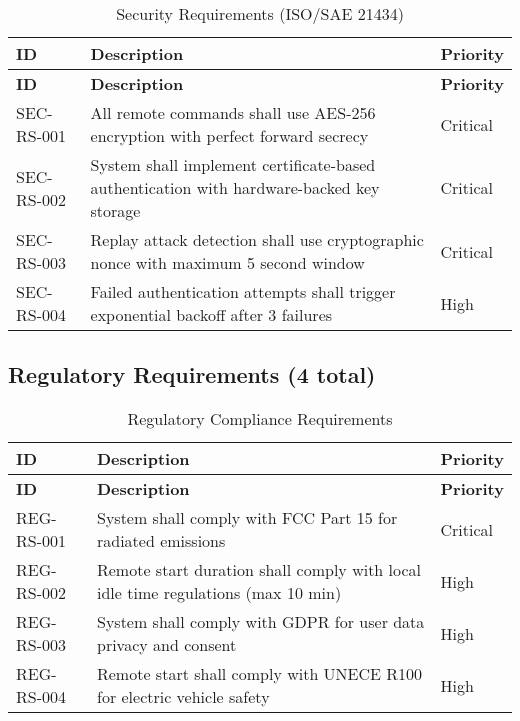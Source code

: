 \documentclass[11pt,a4paper]{article}
\begin{document}
\begin{longtable}{|p{2.5cm}|p{10cm}|p{2cm}|}
\caption{Security Requirements (ISO/SAE 21434)}\label{tab:security_req}\\
\hline
\textbf{ID} & \textbf{Description} & \textbf{Priority} \\
\hline
\endfirsthead
\hline
\textbf{ID} & \textbf{Description} & \textbf{Priority} \\
\hline
\endhead
\hline
\endfoot

SEC-RS-001 & All remote commands shall use AES-256 encryption with perfect forward secrecy & Critical \\
\hline
SEC-RS-002 & System shall implement certificate-based authentication with hardware-backed key storage & Critical \\
\hline
SEC-RS-003 & Replay attack detection shall use cryptographic nonce with maximum 5 second window & Critical \\
\hline
SEC-RS-004 & Failed authentication attempts shall trigger exponential backoff after 3 failures & High \\
\hline
\end{longtable}

\subsection{Regulatory Requirements (4 total)}

\begin{longtable}{|p{2.5cm}|p{10cm}|p{2cm}|}
\caption{Regulatory Compliance Requirements}\label{tab:regulatory_req}\\
\hline
\textbf{ID} & \textbf{Description} & \textbf{Priority} \\
\hline
\endfirsthead
\hline
\textbf{ID} & \textbf{Description} & \textbf{Priority} \\
\hline
\endhead
\hline
\endfoot

REG-RS-001 & System shall comply with FCC Part 15 for radiated emissions & Critical \\
\hline
REG-RS-002 & Remote start duration shall comply with local idle time regulations (max 10 min) & High \\
\hline
REG-RS-003 & System shall comply with GDPR for user data privacy and consent & High \\
\hline
REG-RS-004 & Remote start shall comply with UNECE R100 for electric vehicle safety & High \\
\hline
\end{longtable}
\end{document}
